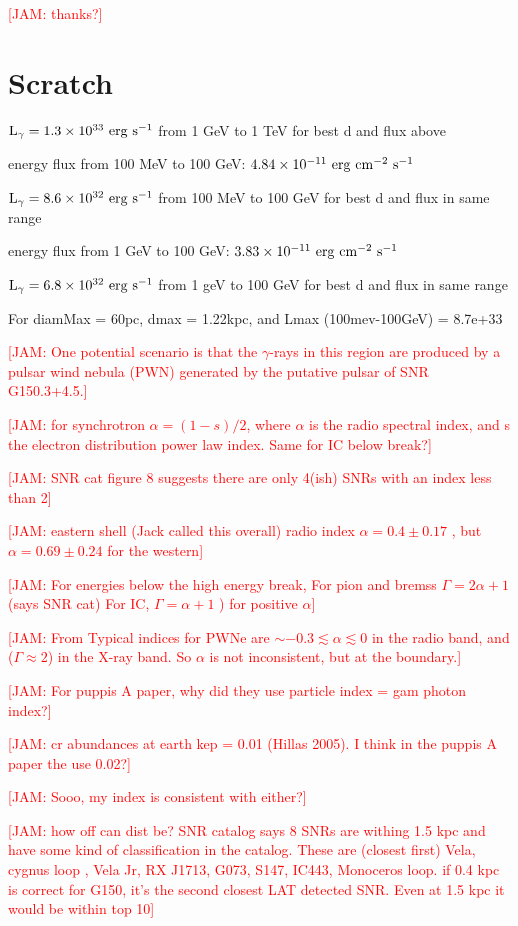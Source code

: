 \documentclass[iop]{emulateapj}
\newcommand{\kibitz}[2]{\ifnum\Comments=1\textcolor{#1}{#2}\fi}
\newcommand{\jamie}[1]{\kibitz{red}      {[JAM: #1]}}
\newcommand{\gam}{$\gamma$-ray}
\newcommand{\Gone}{G150.3+4.5}
\begin{document}
\jamie{thanks?}

\section{Scratch}

${\rm L_{\gamma} = 1.3 \times 10^{33}~erg~s^{-1}}$ from 1 GeV to 1 TeV for best d and flux above


energy flux from 100 MeV to 100 GeV: ${\rm 4.84 \times 10^{-11}~erg~cm^{-2}~s^{-1}} $

${\rm L_{\gamma} = 8.6 \times 10^{32}~erg~s^{-1}}$ from 100 MeV to 100 GeV for best d and flux in same range

energy flux from 1 GeV to 100 GeV: ${\rm 3.83 \times 10^{-11}~erg~cm^{-2}~s^{-1}} $

${\rm L_{\gamma} = 6.8 \times 10^{32}~erg~s^{-1}}$ from 1 geV to 100 GeV for best d and flux in same range

For diamMax = 60pc, dmax = 1.22kpc, and Lmax (100mev-100GeV) = 8.7e+33

\jamie{One potential scenario is that the \gam{}s in this region are produced by a pulsar wind nebula (PWN) generated by the putative pulsar of SNR \Gone{}.} 

\jamie{for synchrotron $\alpha = (1-s)/2$, where $\alpha$ is the radio spectral index, and s the electron distribution power law index. Same for IC below break?}

\jamie{SNR cat figure 8 suggests there are only 4(ish) SNRs with an index less than 2}

\jamie{eastern shell (Jack called this overall) radio index $\alpha = 0.4 \pm 0.17$  \cite{Gao14}, but $\alpha = 0.69 \pm 0.24$ for the western}

\jamie{For energies below the high energy break, For pion and bremss $\Gamma = 2\alpha + 1$ (says SNR cat) For IC, $\Gamma = \alpha + 1 $ ) for positive $\alpha$}

\jamie{From \cite{Gaensler06} Typical indices for PWNe are $\sim -0.3 \lesssim \alpha  \lesssim  0$ in the radio band, and ($\Gamma \approx 2$) in the X-ray band. So $\alpha$ is not inconsistent, but at the boundary.}

\jamie{For puppis A paper, why did they use particle index = gam photon index?}

\jamie{cr abundances at earth kep = 0.01  (Hillas 2005). I think in the puppis A paper the use 0.02?}

\jamie{Sooo, my index is consistent with either?}

\jamie{how off can dist be? SNR catalog says 8 SNRs are withing 1.5 kpc and have some kind of classification in the catalog. These are (closest first) Vela, cygnus loop , Vela Jr, RX J1713, G073, S147, IC443, Monoceros loop. if 0.4 kpc is correct for G150, it's the second closest LAT detected SNR. Even at 1.5 kpc it would be within top 10}
%
%


%

\end{document}
